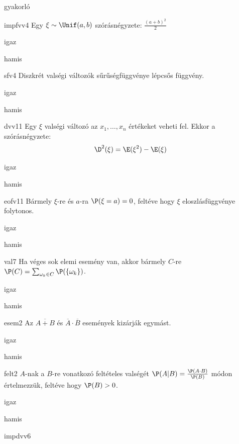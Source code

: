 \documentclass[12pt]{article}
\begin{document}
\begin{quiz}{gyakorló}

\begin{multi}[feedback={wiki}]{impfvv4}
Egy $\xi\sim \Unif(a,b)$ szórásnégyzete: $\frac{(a+b)^2}{2}$
\item igaz
\item* hamis
\end{multi}
\begin{multi}[feedback={Diszkrét vv-nak nincs sfv-e}]{sfv4}
Diszkrét valségi változók sűrűségfüggvénye lépcsős függvény.
\item igaz
\item* hamis
\end{multi}
\begin{multi}[feedback={Def./tulajdonság}]{dvv11}
Egy $\xi$ valségi változó az $x_1,\ldots ,x_n$ értékeket veheti fel. 
Ekkor a szórásnégyzete:
$$
\D^2(\xi)=\E(\xi^2)-\E(\xi)
$$
\item igaz
\item* hamis
\end{multi}
\begin{multi}[feedback={$\P(\xi=a)\le\P(a\le\xi<a+\frac{1}{n})=F(a+\frac{1}{n})-F(a) \overset{n\to\infty}{\to} 0$}]{eofv11}
Bármely $\xi$-re és $a$-ra $\P(\xi= a)=0$, feltéve hogy $\xi$ eloszlásfüggvénye
folytonos.
\item* igaz
\item hamis
\end{multi}
\begin{multi}[feedback={Additívitás.}]{val7}
Ha véges sok elemi esemény van, akkor bármely $C$-re $\P(C)=\sum_{\omega_k\in C} \P( \{\omega_k \})$.
\item* igaz
\item hamis
\end{multi}
\begin{multi}[feedback={de-Morgan azonosság}]{esem2}
Az $\overline{A+B}$ és $\overline{A} \cdot \overline{B}$ események kizárják egymást.
\item igaz
\item* hamis
\end{multi}
\begin{multi}[feedback={Def.}]{felt2}
$A$-nak a $B$-re vonatkozó feltételes valségét $\P(A|B)=\frac{\P(A\cdot B)}{\P(B)}$ módon értelmezzük, feltéve hogy $\P(B)>0$.
\item* igaz
\item hamis
\end{multi}
\begin{multi}[feedback={Def.}]{impdvv6}

\end{multi}
\end{quiz}
\end{document}
